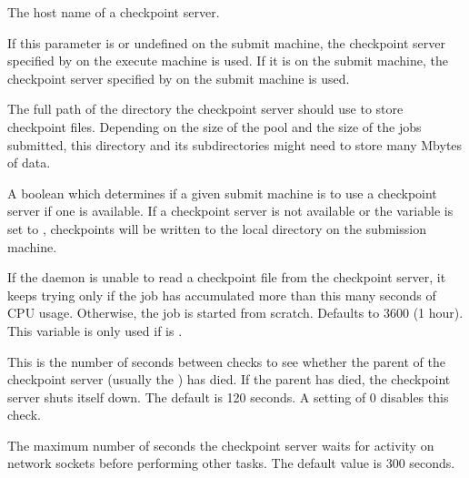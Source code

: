 \begin{description}
  
\label{param:CkptServerHost}
\item[\Macro{CKPT\_SERVER\_HOST}]
  The host name of a checkpoint server.

\label{param:StarterChoosesCkptServer}
\item[\Macro{STARTER\_CHOOSES\_CKPT\_SERVER}]
  If this parameter is  or undefined on
  the submit machine, the checkpoint server specified by
   on the execute machine is used.  If it is
   on the submit machine, the checkpoint server
  specified by  on the submit machine is
  used.
  
\label{param:CkptServerDir}
\item[\Macro{CKPT\_SERVER\_DIR}]
  The full path of the
  directory the checkpoint server should use to store checkpoint files.
  Depending on the size of the pool and the size of the jobs submitted,
  this directory and its subdirectories might
  need to store many Mbytes of data.

\label{param:UseCkptServer}
\item[\Macro{USE\_CKPT\_SERVER}]
  A boolean which determines if a given submit machine is to use a
  checkpoint server if one is available.  If a
  checkpoint server is not available or the variable 
  is set to ,
  checkpoints will be written to the local  directory on
  the submission machine.

\label{param:MaxDiscardedRunTime}
\item[\Macro{MAX\_DISCARDED\_RUN\_TIME}]
  If the  daemon is unable to read a
  checkpoint file from the checkpoint server, it keeps trying only if
  the job has accumulated more than this many seconds of CPU usage.
  Otherwise, the job is started from scratch.  
  Defaults to 3600 (1 hour). 
  This variable is only used if  is .

\label{param:CkptServerCheckParentInterval}
\item[\Macro{CKPT\_SERVER\_CHECK\_PARENT\_INTERVAL}]
  This is the number of seconds between checks to see whether the parent
  of the checkpoint server (usually the ) has died.  If the
  parent has died, the checkpoint server shuts itself down.
  The default is 120 seconds.
  A setting of 0 disables this check.

\label{param:CkptServerInterval}
\item[\Macro{CKPT\_SERVER\_INTERVAL}]
  The maximum number of seconds the checkpoint server
  waits for activity on network sockets before performing other
  tasks. The default value is 300 seconds.


\end{description}
